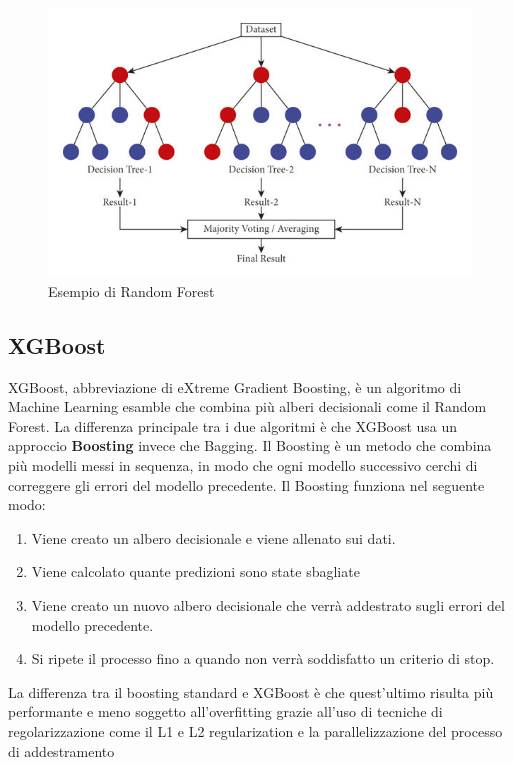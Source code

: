 \documentclass[12pt,a4paper,openright,twoside]{book}
\begin{document}
\begin{figure}
    \centering
    \includegraphics[width=.8\linewidth]{figures/Illustration-of-random-forest-trees.jpg}
    \caption{Esempio di Random Forest \cite{RFIMAGE}}
    \label{fig:random forest}
\end{figure}



\subsection{XGBoost}
XGBoost, abbreviazione di eXtreme Gradient Boosting, è un algoritmo di Machine Learning
esamble che combina più alberi decisionali come il Random Forest.
La differenza principale tra i due algoritmi è che XGBoost usa un approccio
\textbf{Boosting} invece che Bagging.
Il Boosting è un metodo che combina più modelli
messi in sequenza, in modo che ogni modello successivo
cerchi di correggere gli errori del modello precedente.
Il Boosting funziona nel seguente modo:
\begin{enumerate}
    \item Viene creato un albero decisionale e viene allenato sui dati.
    \item Viene calcolato quante predizioni sono state sbagliate
    \item Viene creato un nuovo albero decisionale che verrà addestrato sugli errori del modello precedente.
    \item Si ripete il processo fino a quando non verrà soddisfatto un criterio di stop.
\end{enumerate}

\noindent La differenza tra il boosting standard e XGBoost è che quest'ultimo
risulta più performante e meno soggetto all'overfitting
grazie all'uso di tecniche di regolarizzazione come il L1 e L2 regularization
e la parallelizzazione del processo di addestramento \cite{Xgboost2016}
\end{document}
